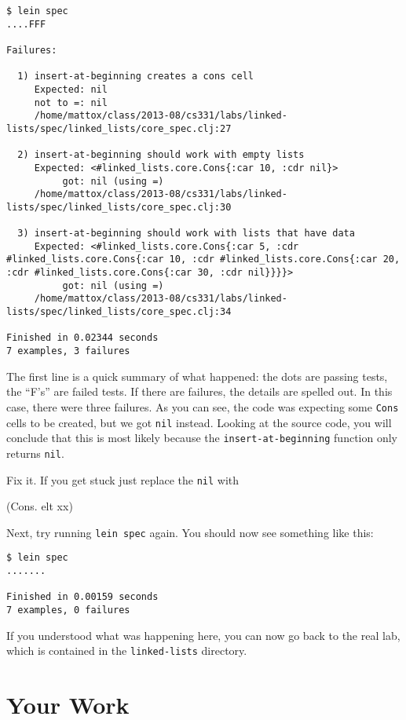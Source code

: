 \documentclass[12pt]{article}
\begin{document}
\begin{verbatim}
$ lein spec
....FFF

Failures:

  1) insert-at-beginning creates a cons cell
     Expected: nil
     not to =: nil
     /home/mattox/class/2013-08/cs331/labs/linked-lists/spec/linked_lists/core_spec.clj:27

  2) insert-at-beginning should work with empty lists
     Expected: <#linked_lists.core.Cons{:car 10, :cdr nil}>
          got: nil (using =)
     /home/mattox/class/2013-08/cs331/labs/linked-lists/spec/linked_lists/core_spec.clj:30

  3) insert-at-beginning should work with lists that have data
     Expected: <#linked_lists.core.Cons{:car 5, :cdr #linked_lists.core.Cons{:car 10, :cdr #linked_lists.core.Cons{:car 20, :cdr #linked_lists.core.Cons{:car 30, :cdr nil}}}}>
          got: nil (using =)
     /home/mattox/class/2013-08/cs331/labs/linked-lists/spec/linked_lists/core_spec.clj:34

Finished in 0.02344 seconds
7 examples, 3 failures
\end{verbatim}

The first line is a quick summary of what happened: the dots are passing tests, the ``F's'' are
failed tests.  If there are failures, the details are spelled out.  In this case, there were three
failures.  As you can see, the code was expecting some \texttt{Cons} cells to be created, but we got
\texttt{nil} instead.  Looking at the source code, you will conclude that this is most likely
because the \texttt{insert-at-beginning} function only returns \texttt{nil}.

Fix it.  If you get stuck just replace the \texttt{nil} with 

\begin{clojurecode}
(Cons. elt xx)
\end{clojurecode}

Next, try running \texttt{lein spec} again.  You should now see something like this:

\begin{verbatim}
$ lein spec
.......

Finished in 0.00159 seconds
7 examples, 0 failures
\end{verbatim}

If you understood what was happening here, you can now go back to the real lab, which is contained
in the \texttt{linked-lists} directory.

\section{Your Work}
\end{document}
